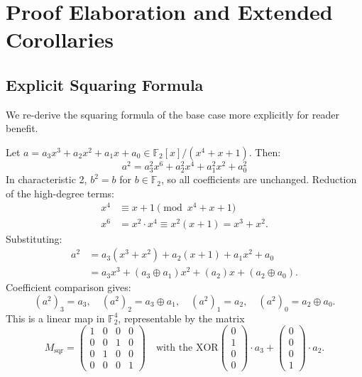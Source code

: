 \section{Proof Elaboration and Extended Corollaries}
\label{sec:71:proof-elaboration}

\subsection{Explicit Squaring Formula}
\label{subsec:71:squaring-formula}

We re-derive the squaring formula of the base case more explicitly
for reader benefit.

Let $a = a_3 x^3 + a_2 x^2 + a_1 x + a_0 \in \mathbb{F}_2[x]/(x^4+x+1)$.
Then:
\[
  a^2 = a_3^2 x^6 + a_2^2 x^4 + a_1^2 x^2 + a_0^2
\]
In characteristic 2, $b^2 = b$ for $b \in \mathbb{F}_2$, so all
coefficients are unchanged.
Reduction of the high-degree terms:
\begin{align*}
  x^4 &\equiv x + 1 \pmod{x^4+x+1} \\
  x^6 &= x^2 \cdot x^4 \equiv x^2(x+1) = x^3 + x^2.
\end{align*}
Substituting:
\begin{align*}
  a^2
  &= a_3(x^3 + x^2) + a_2(x+1) + a_1 x^2 + a_0 \\
  &= a_3 x^3 + (a_3 \oplus a_1)x^2 + (a_2)x + (a_2 \oplus a_0).
\end{align*}
Coefficient comparison gives:
\[
  (a^2)_3 = a_3, \quad
  (a^2)_2 = a_3 \oplus a_1, \quad
  (a^2)_1 = a_2, \quad
  (a^2)_0 = a_2 \oplus a_0.
\]
This is a linear map in $\mathbb{F}_2^4$, representable by the matrix
\[
  M_{\mathrm{sqr}} =
  \begin{pmatrix} 1&0&0&0 \\ 0&0&1&0 \\ 0&1&0&0 \\ 0&0&0&1 \end{pmatrix}
  \quad\text{with the XOR}
  \begin{pmatrix} 0 \\ 1 \\ 0 \\ 0 \end{pmatrix} \cdot a_3
  + \begin{pmatrix} 0 \\ 0 \\ 0 \\ 1 \end{pmatrix} \cdot a_2.
\]
